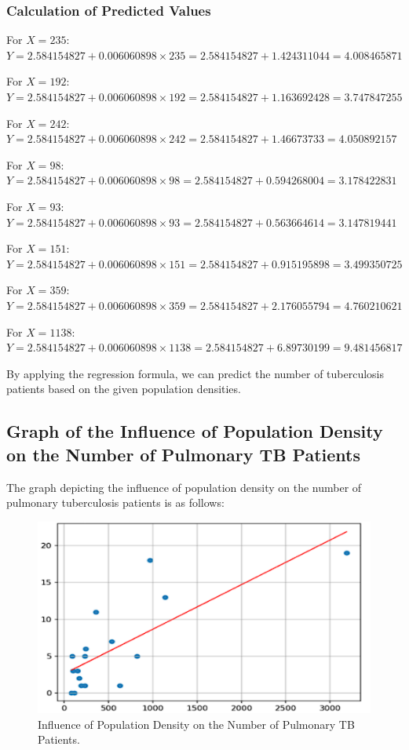 \documentclass[conference]{IEEEtran}
\begin{document}
\subsubsection{Calculation of Predicted Values}


For $X=235$: \\
$Y=2.584154827+0.006060898 \times 235 = 2.584154827+1.424311044 = 4.008465871$

For $X=192$:\\
$Y=2.584154827+0.006060898 \times 192 = 2.584154827+1.163692428 = 3.747847255$

For $X=242$:\\
$Y=2.584154827+0.006060898 \times 242 = 2.584154827+1.46673733 = 4.050892157$

For $X=98$:\\
$Y=2.584154827+0.006060898 \times 98 = 2.584154827+0.594268004 = 3.178422831$

For $X=93$: \\
$Y=2.584154827+0.006060898 \times 93 = 2.584154827+0.563664614 = 3.147819441$

For $X=151$:\\
$Y=2.584154827+0.006060898 \times 151 = 2.584154827+0.915195898 = 3.499350725$

For $X=359$: \\
$Y=2.584154827+0.006060898 \times 359 = 2.584154827+2.176055794 = 4.760210621$

For $X=1138$: \\
$Y=2.584154827+0.006060898 \times 1138 = 2.584154827+6.89730199 = 9.481456817$

By applying the regression formula, we can predict the number of tuberculosis patients based on the given population densities.

\subsection{Graph of the Influence of Population Density on the Number of Pulmonary TB Patients}

The graph depicting the influence of population density on the number of pulmonary tuberculosis patients is as follows:

\begin{figure}[H]
    \centerline{\includegraphics[width=\linewidth]{fig4.png}}
    \caption{Influence of Population Density on the Number of Pulmonary TB Patients.}
    \label{fig4}
\end{figure}
\end{document}
